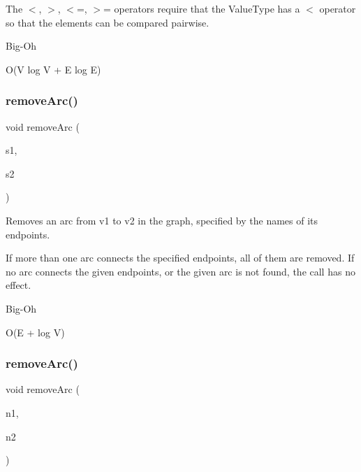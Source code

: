The $<$, $>$, $<$=, $>$= operators require that the Value\+Type has a $<$ operator so that the elements can be compared pairwise. \begin{DoxyRefDesc}{Big-\/\+Oh}
\item[\mbox{\hyperlink{BigOh__BigOh000098}{Big-\/\+Oh}}]O(V log V + E log E) \end{DoxyRefDesc}
\mbox{\label{classGraph_af6370fb52d2dab4eb7795da22c33dd02}} 
\subsubsection{\texorpdfstring{remove\+Arc()}{removeArc()}\hspace{0.1cm}{\footnotesize\ttfamily [1/3]}}
{\footnotesize\ttfamily void remove\+Arc (\begin{DoxyParamCaption}\item[{const std\+::string \&}]{s1,  }\item[{const std\+::string \&}]{s2 }\end{DoxyParamCaption})}



Removes an arc from v1 to v2 in the graph, specified by the names of its endpoints. 

If more than one arc connects the specified endpoints, all of them are removed. If no arc connects the given endpoints, or the given arc is not found, the call has no effect. \begin{DoxyRefDesc}{Big-\/\+Oh}
\item[\mbox{\hyperlink{BigOh__BigOh000084}{Big-\/\+Oh}}]O(E + log V) \end{DoxyRefDesc}
\mbox{\label{classGraph_ae0c9f44b20b49ffae9fecc0a4f156ac1}} 
\subsubsection{\texorpdfstring{remove\+Arc()}{removeArc()}\hspace{0.1cm}{\footnotesize\ttfamily [2/3]}}
{\footnotesize\ttfamily void remove\+Arc (\begin{DoxyParamCaption}\item[{Node\+Type $\ast$}]{n1,  }\item[{Node\+Type $\ast$}]{n2 }\end{DoxyParamCaption})}



